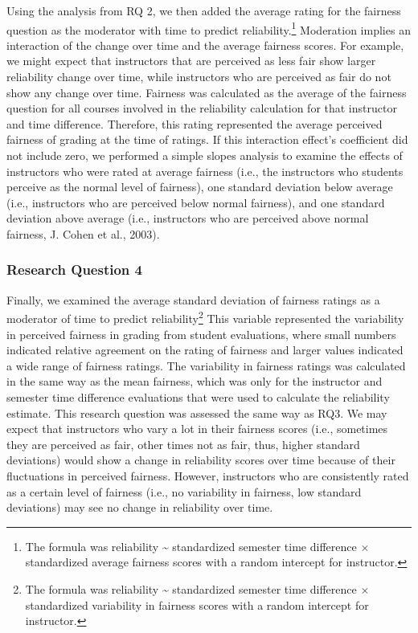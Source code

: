 \documentclass[
  man]{apa7}
\begin{document}
Using the analysis from RQ 2, we then added the average rating for the
fairness question as the moderator with time to predict
reliability.\footnote{The formula was reliability \textasciitilde{} standardized semester time
  difference \(\times\) standardized average fairness scores with a random
  intercept for instructor.} Moderation implies an interaction of the
change over time and the average fairness scores. For example, we might
expect that instructors that are perceived as less fair show larger
reliability change over time, while instructors who are perceived as
fair do not show any change over time. Fairness was calculated as the
average of the fairness question for all courses involved in the
reliability calculation for that instructor and time difference.
Therefore, this rating represented the average perceived fairness of
grading at the time of ratings. If this interaction effect's coefficient
did not include zero, we performed a simple slopes analysis to examine
the effects of instructors who were rated at average fairness (i.e., the
instructors who students perceive as the normal level of fairness), one
standard deviation below average (i.e., instructors who are perceived
below normal fairness), and one standard deviation above average (i.e.,
instructors who are perceived above normal fairness, J. Cohen et al., 2003).

\subsubsection{Research Question 4}\label{research-question-4}

Finally, we examined the average standard deviation of fairness ratings
as a moderator of time to predict reliability\footnote{The formula was
  reliability \textasciitilde{} standardized semester time difference \(\times\) standardized
  variability in fairness scores with a random intercept for instructor.}
This variable represented the variability in perceived fairness in
grading from student evaluations, where small numbers indicated relative
agreement on the rating of fairness and larger values indicated a wide
range of fairness ratings. The variability in fairness ratings was
calculated in the same way as the mean fairness, which was only for the
instructor and semester time difference evaluations that were used to
calculate the reliability estimate. This research question was assessed the same way as RQ3. We may expect that instructors who vary a lot in their fairness scores (i.e., sometimes they are perceived as fair, other times not as fair, thus, higher standard deviations) would show a change in reliability scores over time because of their fluctuations in perceived fairness. However, instructors who are consistently rated as a certain level of fairness (i.e., no variability in fairness, low standard deviations) may see no change in reliability over time.
\end{document}
